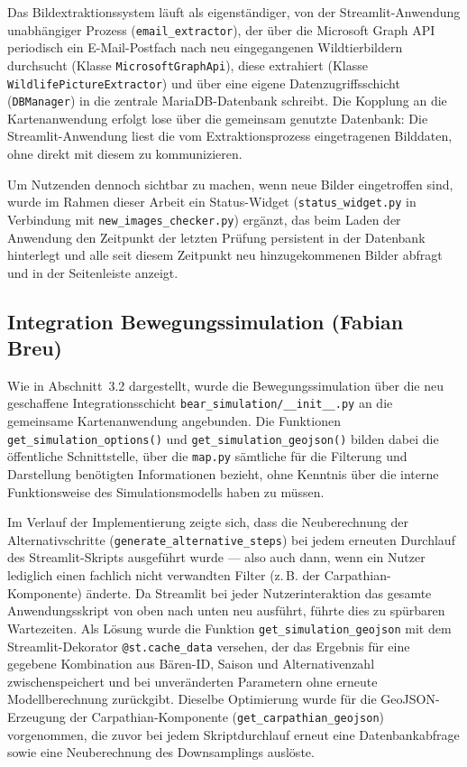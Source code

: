 \documentclass[12pt,a4paper]{report}
\begin{document}
Das Bildextraktionssystem läuft als eigenständiger, von der Streamlit-Anwendung unabhängiger Prozess (\texttt{email\_extractor}), der über die Microsoft Graph API periodisch ein E-Mail-Postfach nach neu eingegangenen Wildtierbildern durchsucht (Klasse \texttt{MicrosoftGraphApi}), diese extrahiert (Klasse \texttt{WildlifePictureExtractor}) und über eine eigene Datenzugriffsschicht (\texttt{DBManager}) in die zentrale MariaDB-Datenbank schreibt. Die Kopplung an die Kartenanwendung erfolgt lose über die gemeinsam genutzte Datenbank: Die Streamlit-Anwendung liest die vom Extraktionsprozess eingetragenen Bilddaten, ohne direkt mit diesem zu kommunizieren.

Um Nutzenden dennoch sichtbar zu machen, wenn neue Bilder eingetroffen sind, wurde im Rahmen dieser Arbeit ein Status-Widget (\texttt{status\_widget.py} in Verbindung mit \texttt{new\_images\_checker.py}) ergänzt, das beim Laden der Anwendung den Zeitpunkt der letzten Prüfung persistent in der Datenbank hinterlegt und alle seit diesem Zeitpunkt neu hinzugekommenen Bilder abfragt und in der Seitenleiste anzeigt.

\subsection{Integration Bewegungssimulation (Fabian Breu)}

Wie in Abschnitt~3.2 dargestellt, wurde die Bewegungssimulation über die neu geschaffene Integrationsschicht \texttt{bear\_simulation/\_\_init\_\_.py} an die gemeinsame Kartenanwendung angebunden. Die Funktionen \texttt{get\_simulation\_options()} und \texttt{get\_simulation\_geojson()} bilden dabei die öffentliche Schnittstelle, über die \texttt{map.py} sämtliche für die Filterung und Darstellung benötigten Informationen bezieht, ohne Kenntnis über die interne Funktionsweise des Simulationsmodells haben zu müssen.

Im Verlauf der Implementierung zeigte sich, dass die Neuberechnung der Alternativschritte (\texttt{generate\_alternative\_steps}) bei jedem erneuten Durchlauf des Streamlit-Skripts ausgeführt wurde — also auch dann, wenn ein Nutzer lediglich einen fachlich nicht verwandten Filter (z.\,B. der Carpathian-Komponente) änderte. Da Streamlit bei jeder Nutzerinteraktion das gesamte Anwendungsskript von oben nach unten neu ausführt, führte dies zu spürbaren Wartezeiten. Als Lösung wurde die Funktion \texttt{get\_simulation\_geojson} mit dem Streamlit-Dekorator \texttt{@st.cache\_data} versehen, der das Ergebnis für eine gegebene Kombination aus Bären-ID, Saison und Alternativenzahl zwischenspeichert und bei unveränderten Parametern ohne erneute Modellberechnung zurückgibt. Dieselbe Optimierung wurde für die GeoJSON-Erzeugung der Carpathian-Komponente (\texttt{get\_carpathian\_geojson}) vorgenommen, die zuvor bei jedem Skriptdurchlauf erneut eine Datenbankabfrage sowie eine Neuberechnung des Downsamplings auslöste.
\end{document}
